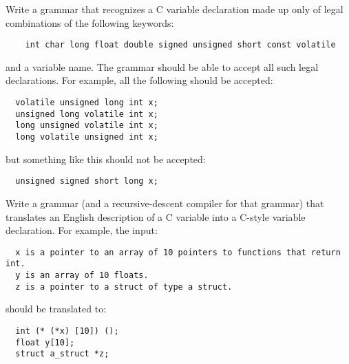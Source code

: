 \begin{question}

 Write a grammar that recognizes a C variable declaration made up only of legal
combinations of the following keywords:
\begin{verbatim}
    int char long float double signed unsigned short const volatile
\end{verbatim}
and a variable name. The grammar should be able to accept all such legal declarations. For example, all the following should be accepted:
\begin{verbatim}
  volatile unsigned long int x;
  unsigned long volatile int x;
  long unsigned volatile int x;
  long volatile unsigned int x;
\end{verbatim}

but something like this should not be accepted:
\begin{verbatim}
  unsigned signed short long x;
\end{verbatim}
\end{question}

\begin{question}

Write a grammar (and a recursive-descent compiler for that grammar) that translates an English description of a C variable into a C-style variable declaration. For example, the input:
\begin{verbatim}
  x is a pointer to an array of 10 pointers to functions that return int.
  y is an array of 10 floats.
  z is a pointer to a struct of type a struct.
\end{verbatim}
should be translated to:
\begin{verbatim}
  int (* (*x) [10]) ();
  float y[10];
  struct a_struct *z;
\end{verbatim}
\end{question}

% 
